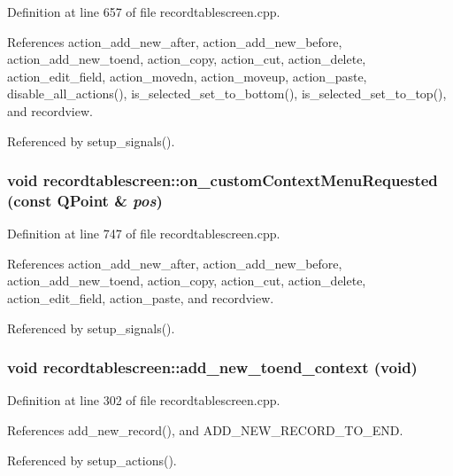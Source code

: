Definition at line 657 of file recordtablescreen.cpp.

References action\_\-add\_\-new\_\-after, action\_\-add\_\-new\_\-before, action\_\-add\_\-new\_\-toend, action\_\-copy, action\_\-cut, action\_\-delete, action\_\-edit\_\-field, action\_\-movedn, action\_\-moveup, action\_\-paste, disable\_\-all\_\-actions(), is\_\-selected\_\-set\_\-to\_\-bottom(), is\_\-selected\_\-set\_\-to\_\-top(), and recordview.

Referenced by setup\_\-signals().
\subsubsection{\setlength{\rightskip}{0pt plus 5cm}void recordtablescreen::on\_\-custom\-Context\-Menu\-Requested (const QPoint \& {\em pos})\hspace{0.3cm}{\tt  [private, slot]}}\label{classrecordtablescreen_4d456453a98a1cda55cf374d4178f6a8}




Definition at line 747 of file recordtablescreen.cpp.

References action\_\-add\_\-new\_\-after, action\_\-add\_\-new\_\-before, action\_\-add\_\-new\_\-toend, action\_\-copy, action\_\-cut, action\_\-delete, action\_\-edit\_\-field, action\_\-paste, and recordview.

Referenced by setup\_\-signals().
\subsubsection{\setlength{\rightskip}{0pt plus 5cm}void recordtablescreen::add\_\-new\_\-toend\_\-context (void)\hspace{0.3cm}{\tt  [private, slot]}}\label{classrecordtablescreen_15da6524cadb2a7400e53d0c44476d63}




Definition at line 302 of file recordtablescreen.cpp.

References add\_\-new\_\-record(), and ADD\_\-NEW\_\-RECORD\_\-TO\_\-END.

Referenced by setup\_\-actions().
